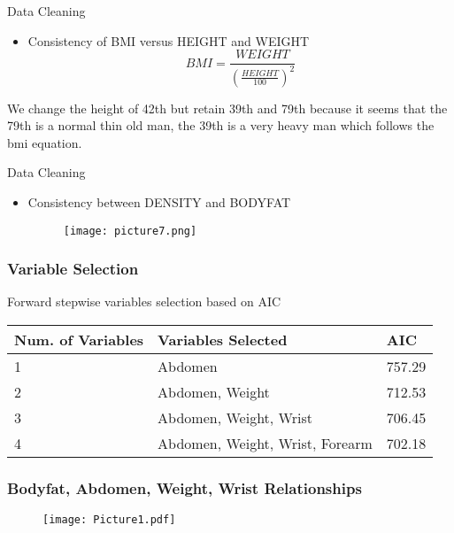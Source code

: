 \documentclass{beamer}
\begin{document}
\begin{frame}{Data Cleaning}
\begin{itemize}
    \item Consistency of BMI versus HEIGHT and WEIGHT
        \[ BMI=\frac{WEIGHT}{(\frac{HEIGHT}{100})^2} \]
\end{itemize}    
We change the height of 42th but retain 39th and 79th because it seems that the 79th is a normal thin old man, the 39th is a very heavy man which follows the bmi equation. 
\end{frame}
\begin{frame}{Data Cleaning}
\begin{itemize}
    \item Consistency between DENSITY and BODYFAT
    \begin{figure}[h]
    \centering
    \texttt{[image: picture7.png]}
    \end{figure}
\end{itemize}
    
\end{frame}


\begin{frame}
\frametitle{Variable Selection}
Forward stepwise variables selection based on AIC\\

\begin{table}
\begin{center}
\begin{tabular}{lll}
\toprule
Num. of Variables & Variables Selected & AIC \\
\midrule
1 & Abdomen & 757.29\\
2 & Abdomen, Weight & 712.53\\
3 & Abdomen, Weight, Wrist & 706.45\\
4 & Abdomen, Weight, Wrist, Forearm & 702.18\\
\bottomrule
\end{tabular}
\end{center}
\end{table}

\end{frame}

\begin{frame}
\frametitle{Bodyfat, Abdomen, Weight, Wrist Relationships}

\begin{figure}[h]
   \centering
   \texttt{[image: Picture1.pdf]}
\end{figure}

\end{frame}
\end{document}
